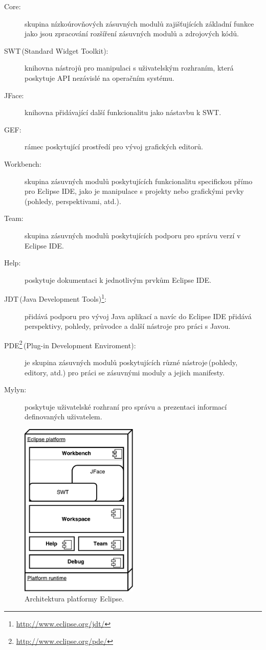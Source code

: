   \begin{description}
    \item[Core:] skupina nízkoúrovňových zásuvných modulů zajišťujících základní funkce jako jsou zpracování rozšíření zásuvných modulů a zdrojových kódů.
    \item[SWT\,(Standard Widget Toolkit):] knihovna nástrojů pro manipulaci s uživatelským rozhraním, která poskytuje API nezávislé na operačním systému.
    \item[JFace:] knihovna přidávající další funkcionalitu jako nástavbu k SWT.
    \item[GEF:] rámec poskytující prostředí pro vývoj grafických editorů.
    \item[Workbench:] skupina zásuvných modulů poskytujících funkcionalitu specifickou přímo pro Eclipse IDE, jako je manipulace s projekty nebo grafickými prvky (pohledy, perspektivami, atd.).
    \item[Team:] skupina zásuvných modulů poskytujících podporu pro správu verzí v Eclipse IDE.
    \item[Help:] poskytuje dokumentaci k jednotlivým prvkům Eclipse IDE.
    \item[JDT\,(Java Development Tools)\footnote{\url{http://www.eclipse.org/jdt/}}:] přidává podporu pro vývoj Java aplikací a navíc do Eclipse IDE přidává perspektivy, pohledy, průvodce a další nástroje pro práci s Javou.
    \item[PDE\footnote{\url{http://www.eclipse.org/pde/}}\,(Plug-in Development Enviroment):] je skupina zásuvných modulů poskytujících různé nástroje\,(pohledy, editory, atd.) pro práci se zásuvnými moduly a jejich manifesty.
    \item[Mylyn:] poskytuje uživatelské rozhraní pro správu a prezentaci informací definovaných uživatelem.
  \end{description}

  \begin{figure}[h]
    \includegraphics[width=0.5\textwidth, center]{obrazky-figures/eclipse_arch.pdf}
    \caption{Architektura platformy Eclipse.}
    \label{fig:eclipse_arch}
  \end{figure}
  
